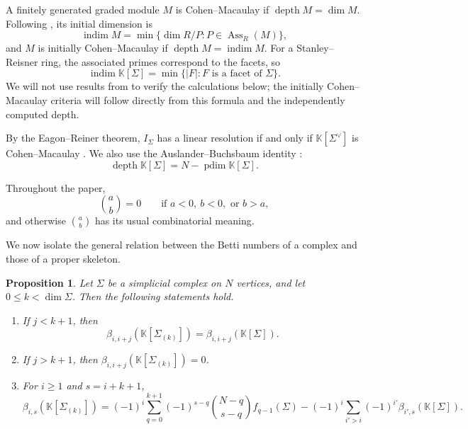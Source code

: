 \documentclass[11pt]{amsart}
\newtheorem{proposition}[theorem]{Proposition}
\theoremstyle{definition}
\theoremstyle{remark}
\newcommand{\K}{\mathbb K}
\newcommand{\SR}[1]{\K[#1]}
\DeclareMathOperator{\pdim}{pdim}
\DeclareMathOperator{\indim}{indim}
\begin{document}
	A finitely generated graded module $M$ is Cohen--Macaulay if $\operatorname{depth}M=\dim M$. Following \cite{Namiq1}, its initial dimension is
	\[
	\indim M=\min\{\dim R/P:P\in\operatorname{Ass}_R(M)\},
	\]
	and $M$ is initially Cohen--Macaulay if $\operatorname{depth}M=\indim M$. For a Stanley--Reisner ring, the associated primes correspond to the facets, so
	\[
	\indim\SR{\Sigma}=\min\{|F|:F\text{ is a facet of }\Sigma\}.
	\]
	We will not use results from \cite{Namiq1} to verify the calculations below; the initially Cohen--Macaulay criteria will follow directly from this formula and the independently computed depth.
	
	By the Eagon--Reiner theorem, $I_\Sigma$ has a linear resolution if and only if $\SR{\Sigma^\vee}$ is Cohen--Macaulay \cite{ER98}. We also use the Auslander--Buchsbaum identity \cite{AB57}:
	\[
	\operatorname{depth}\SR{\Sigma}=N-\pdim\SR{\Sigma}.
	\]
	
	Throughout the paper,
	\[
	\binom ab=0\qquad\text{if }a<0,\ b<0,\text{ or }b>a,
	\]
	and otherwise $\binom ab$ has its usual combinatorial meaning.
	
	We now isolate the general relation between the Betti numbers of a complex and those of a proper skeleton.
	
	\begin{proposition}\label{prop:1}
		Let $\Sigma$ be a simplicial complex on $N$ vertices, and let $0\le k<\dim\Sigma$. Then the following statements hold.
		\begin{enumerate}
			\item[(i)] If $j<k+1$, then
			\[
			\beta_{i,i+j}(\SR{\Sigma_{(k)}})=\beta_{i,i+j}(\SR{\Sigma}).
			\]
			\item[(ii)] If $j>k+1$, then $\beta_{i,i+j}(\SR{\Sigma_{(k)}})=0$.
			\item[(iii)] For $i\ge1$ and $s=i+k+1$,
			\[
			\beta_{i,s}(\SR{\Sigma_{(k)}})
			=(-1)^i\sum_{q=0}^{k+1}(-1)^{s-q}
			\binom{N-q}{s-q}f_{q-1}(\Sigma)
			-(-1)^i\sum_{i'>i}(-1)^{i'}\beta_{i',s}(\SR{\Sigma}).
			\]
		\end{enumerate}
	\end{proposition}
	
\end{document}
